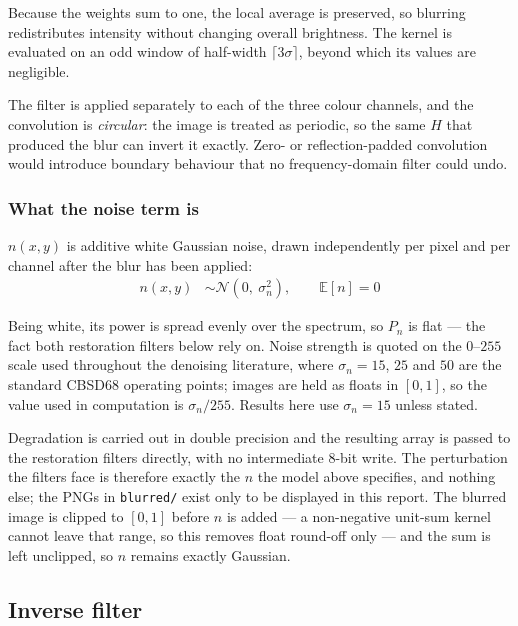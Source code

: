 \documentclass[10pt,twocolumn,letterpaper]{article}
\begin{document}
\noindent Because the weights sum to one, the local average is preserved, so blurring
redistributes intensity without changing overall brightness. The kernel is evaluated on an
odd window of half-width $\lceil 3\sigma \rceil$, beyond which its values are negligible.

\noindent The filter is applied separately to each of the three colour channels, and the
convolution is \emph{circular}: the image is treated as periodic, so the same $H$ that
produced the blur can invert it exactly. Zero- or reflection-padded convolution would
introduce boundary behaviour that no frequency-domain filter could undo.

\subsubsection*{What the noise term is}

$n(x,y)$ is additive white Gaussian noise, drawn independently per pixel and per channel
after the blur has been applied:
\begin{align}
  n(x,y) &\sim \mathcal{N}\!\left(0,\ \sigma_{n}^{2}\right), \qquad
  \mathbb{E}\!\left[n\right] = 0
\end{align}

\noindent Being white, its power is spread evenly over the spectrum, so $P_{n}$ is flat ---
the fact both restoration filters below rely on. Noise strength is quoted on the $0$--$255$
scale used throughout the denoising literature, where $\sigma_{n} = 15$, $25$ and $50$ are
the standard CBSD68 operating points; images are held as floats in $[0,1]$, so the value
used in computation is $\sigma_{n}/255$. Results here use $\sigma_{n} = 15$ unless stated.

\noindent Degradation is carried out in double precision and the resulting array is passed
to the restoration filters directly, with no intermediate 8-bit write. The perturbation the
filters face is therefore exactly the $n$ the model above specifies, and nothing else; the
PNGs in \texttt{blurred/} exist only to be displayed in this report. The blurred image is
clipped to $[0,1]$ before $n$ is added --- a non-negative unit-sum kernel cannot leave that
range, so this removes float round-off only --- and the sum is left unclipped, so $n$
remains exactly Gaussian.

\newpage
\subsection*{Inverse filter}
\end{document}
